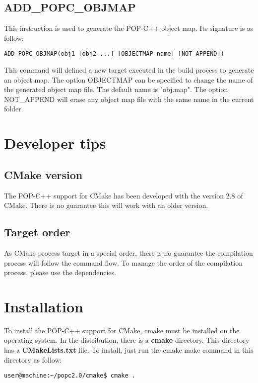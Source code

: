 \documentclass[a4paper, 11pt]{article}
\newcommand{\s}{\vspace{0.3cm}}
\begin{document}
\subsection{ADD\_POPC\_OBJMAP}
This instruction is used to generate the POP-C++ object map. Its signature is as follow:\s
\begin{lstlisting}
ADD_POPC_OBJMAP(obj1 [obj2 ...] [OBJECTMAP name] [NOT_APPEND])
\end{lstlisting}\s

This command will defined a new target executed in the build process to generate an object map. The option OBJECTMAP can be specified to change the name of the generated object map file. The default name is "obj.map". The option NOT\_APPEND will erase any object map file with the same name in the current folder. 

\section{Developer tips}
\label{chap:tips}
\subsection{CMake version}
The POP-C++ support for CMake has been developed with the version 2.8 of CMake. There is no guarantee this will work with an older version. \s

\subsection{Target order}
As CMake process target in a special order, there is no guarantee the compilation process will follow the command flow. To manage the order of the compilation process, please use the dependencies. 

\section{Installation}
\label{chap:install}
To install the POP-C++ support for CMake, cmake must be installed on the operating system. In the distribution, there is a \textbf{cmake} directory. This directory has a \textbf{CMakeLists.txt} file. To install, just run the cmake make command in this directory as follow:\s

\begin{lstlisting}
user@machine:~/popc2.0/cmake$ cmake . 
\end{lstlisting}
\end{document}
